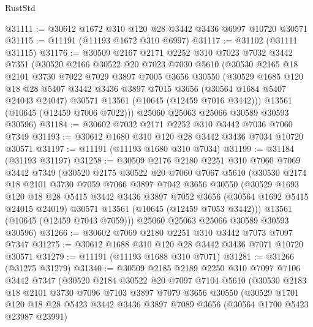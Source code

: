 \begin{lexlean}{RustStd}
\begin{coremodule}
@31111 := @30612 @1672 @310 @120 @28 @3442 @3436 @6997 @10720 @30571
@31115 := @11191 (@11193 @1672 @310 @6997)
@31117 := @31102 (@31111 @31115)
@31176 := @30509
    @2167
    @2171
    @2252
    @310
    @7023
    @7032
    @3442
    @7351
    (@30520
      @2166
      @30522
      @20
      @7023
      @7030
      @5610
      (@30530
        @2165
        @18
        @2101
        @3730
        @7022
        @7029
        @3897
        @7005
        @3656
        @30550
        (@30529
          @1685
          @120
          @18
          @28
          @5407
          @3442
          @3436
          @3897
          @7015
          @3656
          (@30564 @1684 @5407 @24043 @24047)
          @30571
          @13561
          (@10645 (@12459 @7016 @3442)))
        @13561
        (@10645 (@12459 @7006 @7022)))
      @25060
      @25063
      @25066
      @30589
      @30593
      @30596)
@31184 := @30602 @7032 @2171 @2252 @310 @3442 @7036 @7060 @7349
@31193 := @30612 @1680 @310 @120 @28 @3442 @3436 @7034 @10720 @30571
@31197 := @11191 (@11193 @1680 @310 @7034)
@31199 := @31184 (@31193 @31197)
@31258 := @30509
    @2176
    @2180
    @2251
    @310
    @7060
    @7069
    @3442
    @7349
    (@30520
      @2175
      @30522
      @20
      @7060
      @7067
      @5610
      (@30530
        @2174
        @18
        @2101
        @3730
        @7059
        @7066
        @3897
        @7042
        @3656
        @30550
        (@30529
          @1693
          @120
          @18
          @28
          @5415
          @3442
          @3436
          @3897
          @7052
          @3656
          (@30564 @1692 @5415 @24015 @24019)
          @30571
          @13561
          (@10645 (@12459 @7053 @3442)))
        @13561
        (@10645 (@12459 @7043 @7059)))
      @25060
      @25063
      @25066
      @30589
      @30593
      @30596)
@31266 := @30602 @7069 @2180 @2251 @310 @3442 @7073 @7097 @7347
@31275 := @30612 @1688 @310 @120 @28 @3442 @3436 @7071 @10720 @30571
@31279 := @11191 (@11193 @1688 @310 @7071)
@31281 := @31266 (@31275 @31279)
@31340 := @30509
    @2185
    @2189
    @2250
    @310
    @7097
    @7106
    @3442
    @7347
    (@30520
      @2184
      @30522
      @20
      @7097
      @7104
      @5610
      (@30530
        @2183
        @18
        @2101
        @3730
        @7096
        @7103
        @3897
        @7079
        @3656
        @30550
        (@30529
          @1701
          @120
          @18
          @28
          @5423
          @3442
          @3436
          @3897
          @7089
          @3656
          (@30564 @1700 @5423 @23987 @23991)

\end{coremodule}
\end{lexlean}
